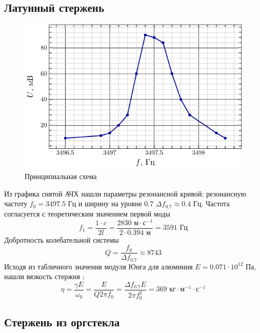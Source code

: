 \subsection{Латунный стержень}
\begin{figure}[H]
	\centering
	\includegraphics[scale=1.5]{fig/lat_afc}
	\caption{Принципиальная схема}
	\label{fig:chem11}
\end{figure}

Из графика снятой АЧХ нашли параметры резонансной кривой: резонансную частоту
$f_0=3497.5 \text{ Гц}$ и ширину на уровне 0.7 $\Delta f_{0.7} \approx 0.4\text{ Гц}$. 
Частота согласуется с теоретическим значением первой моды
\begin{equation}
	f_1 = \frac{1\cdot c}{2l} = \frac{2830 \text{ м}\cdot\text{с}^{-1}}{2\cdot 0.394\text{ м}}=3591 \text{ Гц}
\end{equation}
Добротность колебательной системы
\begin{equation}
	Q = \frac{f_0}{\Delta f_{0.7}} \approx 8743
\end{equation}
Исходя из табличного значения модуля Юнга для алюминия $E=0.071\cdot10^{12}$ Па, нашли вязкость стержня  \cite[стр. 10]{met}:
\begin{equation}
	\eta = \frac{\gamma E}{\omega_0}= \frac{ E}{Q 2\pi f_0} = \frac{\Delta f_{0.7} E}{2\pi f_0^2}= 369 \text{ кг}\cdot\text{м}^{-1}\cdot\text{с}^{-1}
\end{equation}


\subsection{Стержень из оргстекла}

